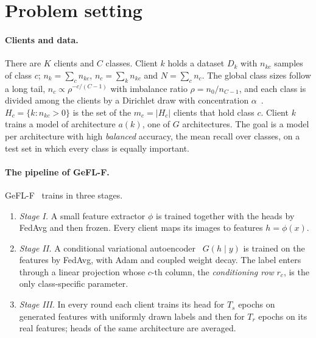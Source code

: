 \section{Problem setting}\label{sec:setting}

\paragraph{Clients and data.} There are $K$ clients and $C$ classes. Client $k$ holds a dataset $D_k$ with $n_{kc}$
samples of class $c$; $n_k=\sum_c n_{kc}$, $n_c=\sum_k n_{kc}$ and $N=\sum_c n_c$. The global class sizes follow a
long tail, $n_c\propto \rho^{-c/(C-1)}$ with imbalance ratio $\rho=n_0/n_{C-1}$, and each class is divided among
the clients by a Dirichlet draw with concentration $\alpha$~\cite{hsu2019dirichlet}. $H_c=\{k: n_{kc}>0\}$ is the
set of the $m_c=|H_c|$ clients that hold class $c$. Client $k$ trains a model of architecture $a(k)$, one of $G$
architectures. The goal is a model per architecture with high \emph{balanced} accuracy, the mean recall over classes,
on a test set in which every class is equally important.

\paragraph{The pipeline of GeFL-F.} GeFL-F~\cite{kang2025gefl} trains in three stages.
\begin{enumerate}
\item \emph{Stage I.} A small feature extractor $\phi$ is trained together with the heads by FedAvg and then frozen.
Every client maps its images to features $h=\phi(x)$.
\item \emph{Stage II.} A conditional variational autoencoder~\cite{sohn2015cvae} $G(h\mid y)$ is trained on the
features by FedAvg, with Adam and coupled weight decay. The label enters through a linear projection whose $c$-th
column, the \emph{conditioning row} $r_c$, is the only class-specific parameter.
\item \emph{Stage III.} In every round each client trains its head for $T_s$ epochs on generated features with
uniformly drawn labels and then for $T_r$ epochs on its real features; heads of the same architecture are averaged.
\end{enumerate}

